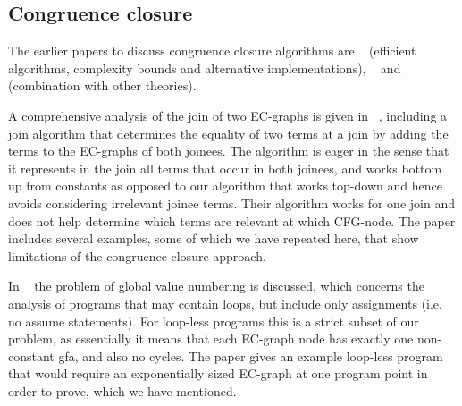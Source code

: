 %
%
%

\subsection{Congruence closure}
The earlier papers to discuss congruence closure algorithms are ~\cite{DowneySethiTarjan} (efficient algorithms, complexity bounds and alternative implementations), ~\cite{Shostak84} and ~\cite{NelsonOppen80} (combination with other theories). 

A comprehensive analysis of the join of two EC-graphs is given in ~\cite{GulwaniTiwariNecula04}, including a join algorithm that determines the equality of two terms at a join by adding the terms to the EC-graphs of both joinees. 
The algorithm is eager in the sense that it represents in the join all terms that occur in both joinees, 
and works bottom up from constants as opposed to our algorithm that works top-down and hence avoids considering irrelevant joinee terms.
Their algorithm works for one join and does not help determine which terms are relevant at which CFG-node.
The paper includes several examples, some of which we have repeated here, that show limitations of the congruence closure approach.

In ~\cite{GulwaniNecula07} the problem of global value numbering is discussed, 
which concerns the analysis of programs that may contain loops, but include only assignments (i.e. no assume statements).
For loop-less programs this is a strict subset of our problem, as essentially it means that each EC-graph node has exactly one non-constant gfa, and also no cycles. The paper gives an example loop-less program that would require an exponentially sized EC-graph at one program point in order to prove, which we have mentioned.

